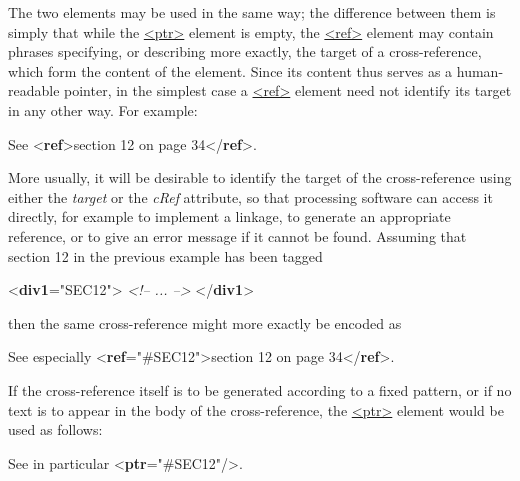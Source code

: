 The two elements may be used in the same way; the difference between them is simply that while the \hyperref[TEI.ptr]{<ptr>} element is empty, the \hyperref[TEI.ref]{<ref>} element may contain phrases specifying, or describing more exactly, the target of a cross-reference, which form the content of the element. Since its content thus serves as a human-readable pointer, in the simplest case a \hyperref[TEI.ref]{<ref>} element need not identify its target in any other way. For example: \par\bgroup{}\exampleFont \begin{shaded}\noindent\mbox{}See {<\textbf{ref}>}section 12 on page 34{</\textbf{ref}>}.\end{shaded}\egroup\par \par
More usually, it will be desirable to identify the target of the cross-reference using either the {\itshape target} or the {\itshape cRef} attribute, so that processing software can access it directly, for example to implement a linkage, to generate an appropriate reference, or to give an error message if it cannot be found. Assuming that section 12 in the previous example has been tagged \par\bgroup{}\exampleFont \begin{shaded}\noindent\mbox{}{<\textbf{div1}\hspace*{1em}{xml:id}="{SEC12}">}\mbox{}\newline 
\textit{<!-- ... -->}\mbox{}\newline 
{</\textbf{div1}>}\end{shaded}\egroup\par \noindent  then the same cross-reference might more exactly be encoded as \par\bgroup{}\exampleFont \begin{shaded}\noindent\mbox{}See especially {<\textbf{ref}\hspace*{1em}{target}="{\#SEC12}">}section 12 on page 34{</\textbf{ref}>}.\end{shaded}\egroup\par \par
If the cross-reference itself is to be generated according to a fixed pattern, or if no text is to appear in the body of the cross-reference, the \hyperref[TEI.ptr]{<ptr>} element would be used as follows: \par\bgroup{}\exampleFont \begin{shaded}\noindent\mbox{}See in particular {<\textbf{ptr}\hspace*{1em}{target}="{\#SEC12}"/>}.\end{shaded}\egroup\par \par
